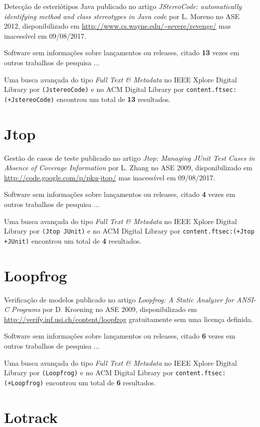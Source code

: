 Detecção de esteriótipos Java
publicado no artigo {\it JStereoCode: automatically identifying method and class stereotypes in Java code}
por L. Moreno
no ASE 2012,
disponibilizado em \url{http://www.cs.wayne.edu/~severe/revenge/}
mas inacessível em 09/08/2017.

Software sem informações sobre lançamentos ou releases,
citado {\bf 13} vezes em outros trabalhos de pesquisa ...

Uma busca avançada do tipo {\it Full Text \& Metadata} no IEEE Xplore Digital Library por
\texttt{(JstereoCode)}
e no ACM Digital Library por
\texttt{content.ftsec:(+JstereoCode)}
encontrou um total de
{\bf 13}
resultados.

\section{Jtop}

Gestão de casos de teste
publicado no artigo {\it Jtop: Managing JUnit Test Cases in Absence of Coverage Information}
por L. Zhang
no ASE 2009,
disponibilizado em \url{http://code.google.com/p/pku-jtop/}
mas inacessível em 09/08/2017.

Software sem informações sobre lançamentos ou releases,
citado {\bf 4} vezes em outros trabalhos de pesquisa ...

Uma busca avançada do tipo {\it Full Text \& Metadata} no IEEE Xplore Digital Library por
\texttt{(Jtop JUnit)}
e no ACM Digital Library por
\texttt{content.ftsec:(+Jtop +JUnit)}
encontrou um total de
{\bf 4}
resultados.

\section{Loopfrog}

Verificação de modelos
publicado no artigo {\it Loopfrog: A Static Analyzer for ANSI-C Programs}
por D. Kroening
no ASE 2009,
disponibilizado em \url{http://verify.inf.usi.ch/content/loopfrog}
gratuitamente
sem uma licença definida.

Software sem informações sobre lançamentos ou releases,
citado {\bf 6} vezes em outros trabalhos de pesquisa ...

Uma busca avançada do tipo {\it Full Text \& Metadata} no IEEE Xplore Digital Library por
\texttt{(Loopfrog)}
e no ACM Digital Library por
\texttt{content.ftsec:(+Loopfrog)}
encontrou um total de
{\bf 6}
resultados.

\section{Lotrack}

